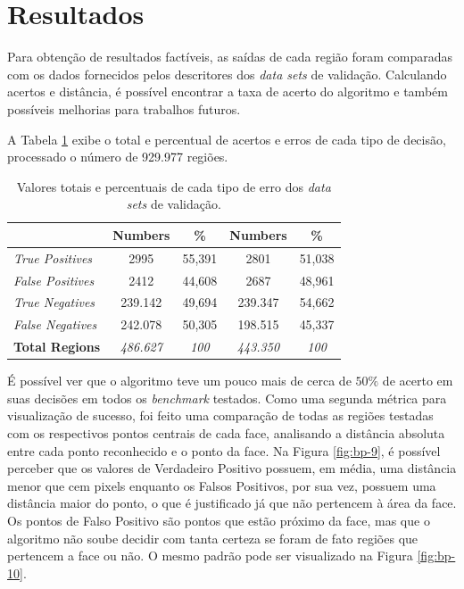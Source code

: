 \documentclass[10pt, conference]{IEEEtran}
\begin{document}
\section{Resultados} \label{sec:resultados}
	Para obtenção de resultados factíveis, as saídas de cada região foram comparadas com os dados fornecidos pelos descritores dos \textit{data sets} de validação. Calculando acertos e distância, é possível encontrar a taxa de acerto do algoritmo e também possíveis melhorias para trabalhos futuros.
	
	A Tabela \ref{tab:erros} exibe o total e percentual de acertos e erros de cada tipo de decisão, processado o número de 929.977 regiões.
	
	\begin{table}[H]
		\centering
		\caption{Valores totais e percentuais de cada tipo de erro dos \textit{data sets} de validação.}
		\label{tab:erros}
		\begin{tabular}{|l|c|c||c|c|}
			\hline
			& \textbf{Numbers} & \textbf{\%}     & \textbf{Numbers} & \textbf{\%}     \\ \hline
			\textit{True Positives}  & 2995    & 55,391 & 2801    & 51,038 \\ \hline
			\textit{False Positives} & 2412    & 44,608 & 2687    & 48,961 \\ \hline \hline
			\textit{True Negatives}  & 239.142 & 49,694 & 239.347 & 54,662 \\ \hline
			\textit{False Negatives} & 242.078 & 50,305 & 198.515 & 45,337 \\ \hline \hline \hline
			\textbf{Total Regions}   & \textit{486.627} & \textit{100}    & \textit{443.350} & \textit{100}    \\ \hline
		\end{tabular}
	\end{table}

	É possível ver que o algoritmo teve um pouco mais de cerca de $ 50\% $ de acerto em suas decisões em todos os \textit{benchmark} testados. Como uma segunda métrica para visualização de sucesso, foi feito uma comparação de todas as regiões testadas com os respectivos pontos centrais de cada face, analisando a distância absoluta entre cada ponto reconhecido e o ponto da face. Na Figura \ref{fig:bp-9}, é possível perceber que os valores de Verdadeiro Positivo possuem, em média, uma distância menor que cem pixels enquanto os Falsos Positivos, por sua vez, possuem uma distância maior do ponto, o que é justificado já que não pertencem à área da face. Os pontos de Falso Positivo são pontos que estão próximo da face, mas que o algoritmo não soube decidir com tanta certeza se foram de fato regiões que pertencem a face ou não. O mesmo padrão pode ser visualizado na Figura \ref{fig:bp-10}.
	
\end{document}
